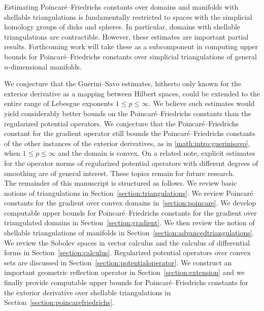 \documentclass[12pt,a4paper]{article}
\begin{document}
Estimating Poincar\'e--Friedrichs constants over domains and manifolds with shellable triangulations is fundamentally restricted to spaces with the simplicial homology groups of disks and spheres. In particular, domains with shellable triangulations are contractible. However, these estimates are important partial results. Forthcoming work will take these as a subcomponent in computing upper bounds for Poincar\'e--Friedrichs constants over simplicial triangulations of general $n$-dimensional manifolds. 

We conjecture that the Guerini--Savo estimates, hitherto only known for the exterior derivative as a mapping between Hilbert spaces, could be extended to the entire range of Lebesgue exponents $1 \leq p \leq \infty$. We believe such estimates would yield considerably better bounds on the Poincar\'e--Friedrichs constants than the regularized potential operators. We conjecture that the Poincar\'e--Friedrichs constant for the gradient operator still bounds the Poincar\'e--Friedrichs constants of the other instances of the exterior derivatives, as in \eqref{math:intro:guerinisavo}, when $1 \leq p \leq \infty$ and the domain is convex. On a related note, explicit estimates for the operator norms of regularized potential operators with different degrees of smoothing are of general interest. These topics remain for future research. 
\\

The remainder of this manuscript is structured as follows.
We review basic notions of triangulations in Section~\ref{section:triangulations}.
We review Poincar\'e constants for the gradient over convex domains in~\ref{section:poincare}.
We develop computable upper bounds for Poincar\'e--Friedrichs constants for the gradient over triangulated domains in Section~\ref{section:gradient}.
We then review the notion of shellable triangulations of manifolds in Section~\ref{section:advancedtriangulations}.
We review the Sobolev spaces in vector calculus and the calculus of differential forms in Section~\ref{section:calculus}.
Regularized potential operators over convex sets are discussed in Section~\ref{section:potentialoperator}.
We construct an important geometric reflection operator in Section~\ref{section:extension}
and we finally provide computable upper bounds for Poincar\'e--Friedrichs constants for the exterior derivative over shellable triangulations in Section~\ref{section:poincarefriedrichs}.
\end{document}
